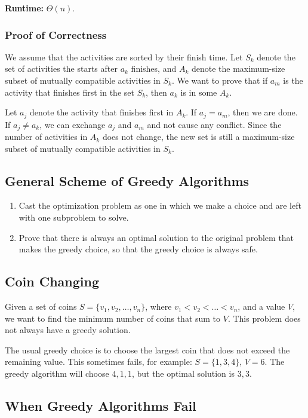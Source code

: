 \documentclass[a4paper,12pt]{article}
\begin{document}
\textbf{Runtime:}
$\Theta(n)$.

\subsubsection{Proof of Correctness}

We assume that the activities are sorted by their finish time.
Let $S_k$ denote the set of activities the starts after $a_k$ finishes, and $A_k$ denote the maximum-size subset of mutually compatible activities in $S_k$.
We want to prove that if $a_m$ is the activity that finishes first in the set $S_k$, then $a_k$ is in some $A_k$.

Let $a_j$ denote the activity that finishes first in $A_k$.
If $a_j = a_m$, then we are done.
If $a_j \neq a_k$, we can exchange $a_j$ and $a_m$ and not cause any conflict.
Since the number of activities in $A_k$ does not change, the new set is still a maximum-size subset of mutually compatible activities in $S_k$.

\subsection{General Scheme of Greedy Algorithms}

\begin{enumerate}
	\item Cast the optimization problem as one in which we make a choice and are left with one subproblem to solve.
	\item Prove that there is always an optimal solution to the original problem that makes the greedy choice, so that the greedy choice is always safe.
\end{enumerate}

\subsection{Coin Changing}

Given a set of coins $S = \{v_1, v_2, \dots, v_n\}$, where $v_1 < v_2 < \dots < v_n$, and a value $V$, we want to find the minimum number of coins that sum to $V$.
This problem does not always have a greedy solution.

The usual greedy choice is to choose the largest coin that does not exceed the remaining value.
This sometimes fails, for example: $S = \{1, 3, 4\}$, $V = 6$.
The greedy algorithm will choose $4, 1, 1$, but the optimal solution is $3, 3$.

\subsection{When Greedy Algorithms Fail}
\end{document}
